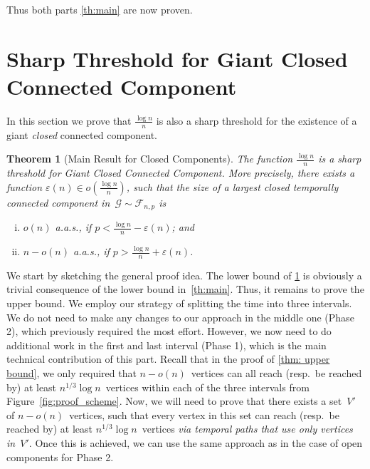 \documentclass[a4paper,11pt]{article}
\theoremstyle{definition}
\theoremstyle{plain}
\newtheorem{theorem}{Theorem}
\let\eps\varepsilon
\newcommand{\G}{\mathcal G}
\newcommand{\F}{\mathcal F}
\newcommand{\pfrac}[2]{{\left(\frac{#1}{#2}\right)}}
\begin{document}
Thus both parts \cref{th:main} are now proven.






\section{Sharp Threshold for Giant Closed Connected Component}
\label{sec:threshold-closed}

In this section we prove that $\frac{\log n}{n}$ is also a sharp threshold for the existence of a giant \emph{closed} connected component.


\begin{theorem}[Main Result for Closed Components]
	\label{thm:closed-component}
	The function $\frac{\log n}{n}$ is a sharp threshold for Giant Closed Connected Component.
	More precisely, there exists a function $\eps(n) \in o\pfrac{\log n}{n}$,
	such that the size of a largest closed temporally connected component in~$\G \sim \F_{n,p}$ is
	\begin{enumerate}[(i)]
		\item $o(n)$ a.a.s., if $p < \frac{\log n}{n} - \eps(n)$; and
		\item $n-o(n)$ a.a.s., if $p > \frac{\log n}{n} + \eps(n)$.
	\end{enumerate}
\end{theorem}

We start by sketching the general proof idea.
%
  The lower bound of \cref{thm:closed-component} is obviously a trivial consequence of the lower bound in~\cref{th:main}.
  Thus, it remains to prove the upper bound.
  We employ our strategy of splitting the time into three intervals. 
  We do not need to make any changes to our approach in the middle one (Phase 2), which previously required the most effort.
  However, we now need to do additional work in the first and last interval (Phase 1), which is the main technical contribution of this part.
  Recall that in the proof of \cref{thm: upper bound}, we only required that $n-o(n)$~vertices can all reach (resp.\ be reached by) at least $n^{1/3} \log n$~vertices within each of the three intervals from Figure~\ref{fig:proof_scheme}.
  Now, we will need to prove that there exists a set~$V'$ of $n-o(n)$~vertices,
  such that every vertex in this set can reach (resp.\ be reached by) at least $n^{1/3}\log n$~vertices \emph{via temporal paths that use only vertices in~$V'$}. Once this is achieved, we can use the same approach as in the case of open components for Phase 2.
\end{document}

